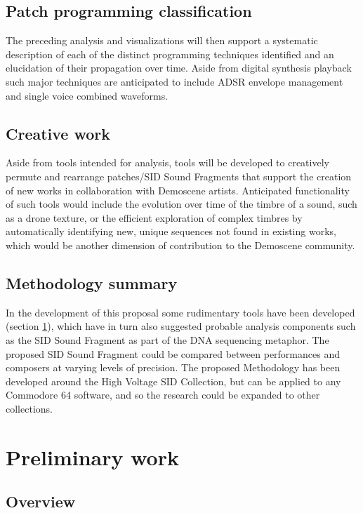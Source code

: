 \documentclass[10pt]{article}
\begin{document}
\begin{multicols*}{2}
\subsection{Patch programming classification}

The preceding analysis and visualizations will then support a systematic description of each of the distinct programming techniques identified and an elucidation of their propagation over time. Aside from digital synthesis playback such major techniques are anticipated to include ADSR envelope management and single voice combined waveforms.

\subsection{Creative work}

Aside from tools intended for analysis, tools will be developed to creatively permute and rearrange patches/SID Sound Fragments that support the creation of new works in collaboration with Demoscene artists. Anticipated functionality of such tools would include the evolution over time of the timbre of a sound, such as a drone texture, or the efficient exploration of complex timbres by automatically identifying new, unique sequences not found in existing works, which would be another dimension of contribution to the Demoscene community.

\subsection{Methodology summary}

In the development of this proposal some rudimentary tools have been developed (section \ref{prelim}), which have in turn also suggested probable analysis components such as the SID Sound Fragment as part of the DNA sequencing metaphor. The proposed SID Sound Fragment could be compared between performances and composers at varying levels of precision. The proposed Methodology has been developed around the High Voltage SID Collection, but can be applied to any Commodore 64 software, and so the research could be expanded to other collections.

\section{Preliminary work}
\label{prelim}

\subsection{Overview}
\label{prelimover}


\end{multicols*}
\end{document}
